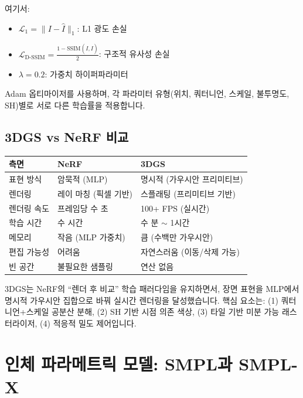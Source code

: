 \documentclass[11pt, a4paper]{report}
\begin{document}
여기서:
\begin{itemize}[leftmargin=*]
  \item $\mathcal{L}_1 = \| I - \hat{I} \|_1$: L1 광도 손실
  \item $\mathcal{L}_{\text{D-SSIM}} = \frac{1 - \text{SSIM}(I, \hat{I})}{2}$: 구조적 유사성 손실
  \item $\lambda = 0.2$: 가중치 하이퍼파라미터
\end{itemize}

Adam 옵티마이저를 사용하며, 각 파라미터 유형(위치, 쿼터니언, 스케일, 불투명도, SH)별로 서로 다른 학습률을 적용합니다.


\section{3DGS vs NeRF 비교}

\begin{center}
\renewcommand{\arraystretch}{1.4}
\begin{tabular}{p{3cm}p{5cm}p{5cm}}
\toprule
\textbf{측면} & \textbf{NeRF} & \textbf{3DGS} \\
\midrule
표현 방식 & 암묵적 (MLP) & 명시적 (가우시안 프리미티브) \\
렌더링 & 레이 마칭 (픽셀 기반) & 스플래팅 (프리미티브 기반) \\
렌더링 속도 & 프레임당 수 초 & 100+ FPS (실시간) \\
학습 시간 & 수 시간 & 수 분 $\sim$ 1시간 \\
메모리 & 작음 (MLP 가중치) & 큼 (수백만 가우시안) \\
편집 가능성 & 어려움 & 자연스러움 (이동/삭제 가능) \\
빈 공간 & 불필요한 샘플링 & 연산 없음 \\
\bottomrule
\end{tabular}
\end{center}

\begin{summary}
3DGS는 NeRF의 ``렌더 후 비교'' 학습 패러다임을 유지하면서, 장면 표현을 MLP에서 명시적 가우시안 집합으로 바꿔 실시간 렌더링을 달성했습니다. 핵심 요소는: (1) 쿼터니언+스케일 공분산 분해, (2) SH 기반 시점 의존 색상, (3) 타일 기반 미분 가능 래스터라이저, (4) 적응적 밀도 제어입니다.
\end{summary}


\chapter{인체 파라메트릭 모델: SMPL과 SMPL-X}
\label{ch:smpl}
\end{document}
